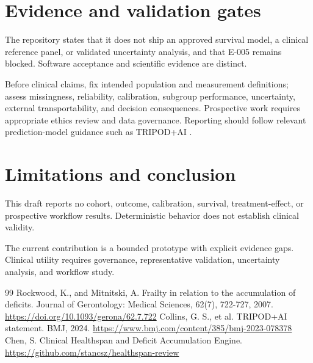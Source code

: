 \documentclass[11pt]{article}
\begin{document}
\section{Evidence and validation gates}
The repository states \cite{r3} that it does not ship an approved survival model, a clinical reference panel, or validated uncertainty analysis, and that E-005 remains blocked. Software acceptance and scientific evidence are distinct.\par
Before clinical claims, fix intended population and measurement definitions; assess missingness, reliability, calibration, subgroup performance, uncertainty, external transportability, and decision consequences. Prospective work requires appropriate ethics review and data governance. Reporting should follow relevant prediction-model guidance such as TRIPOD+AI \cite{r2}.\par
\section{Limitations and conclusion}
This draft reports no cohort, outcome, calibration, survival, treatment-effect, or prospective workflow results. Deterministic behavior does not establish clinical validity.\par
The current contribution is a bounded prototype with explicit evidence gaps. Clinical utility requires governance, representative validation, uncertainty analysis, and workflow study.\par
\begin{thebibliography}{99}
 Rockwood, K., and Mitnitski, A. Frailty in relation to the accumulation of deficits. Journal of Gerontology: Medical Sciences, 62(7), 722-727, 2007. \url{https://doi.org/10.1093/gerona/62.7.722}
 Collins, G. S., et al. TRIPOD+AI statement. BMJ, 2024. \url{https://www.bmj.com/content/385/bmj-2023-078378}
 Chen, S. Clinical Healthspan and Deficit Accumulation Engine. \url{https://github.com/stancsz/healthspan-review}
\end{thebibliography}
\end{document}

